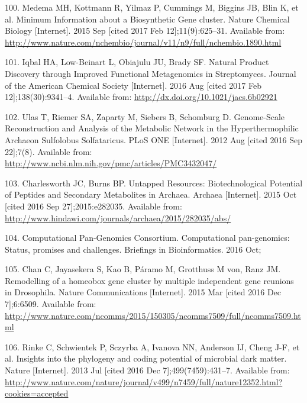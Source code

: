 \documentclass[12pt,twoside]{reedthesis}
\begin{document}
  \hypertarget{ref-medema_minimum_2015}{}
  100. Medema MH, Kottmann R, Yilmaz P, Cummings M, Biggins JB, Blin K, et
  al. Minimum Information about a Biosynthetic Gene cluster. Nature
  Chemical Biology {[}Internet{]}. 2015 Sep {[}cited 2017 Feb
  12{]};11(9):625--31. Available from:
  \url{http://www.nature.com/nchembio/journal/v11/n9/full/nchembio.1890.html}
  
  \hypertarget{ref-iqbal_natural_2016}{}
  101. Iqbal HA, Low-Beinart L, Obiajulu JU, Brady SF. Natural Product
  Discovery through Improved Functional Metagenomics in Streptomyces.
  Journal of the American Chemical Society {[}Internet{]}. 2016 Aug
  {[}cited 2017 Feb 12{]};138(30):9341--4. Available from:
  \url{http://dx.doi.org/10.1021/jacs.6b02921}
  
  \hypertarget{ref-ulas_genome-scale_2012}{}
  102. Ulas T, Riemer SA, Zaparty M, Siebers B, Schomburg D. Genome-Scale
  Reconstruction and Analysis of the Metabolic Network in the
  Hyperthermophilic Archaeon Sulfolobus Solfataricus. PLoS ONE
  {[}Internet{]}. 2012 Aug {[}cited 2016 Sep 22{]};7(8). Available from:
  \url{http://www.ncbi.nlm.nih.gov/pmc/articles/PMC3432047/}
  
  \hypertarget{ref-charlesworth_untapped_2015}{}
  103. Charlesworth JC, Burns BP. Untapped Resources: Biotechnological
  Potential of Peptides and Secondary Metabolites in Archaea. Archaea
  {[}Internet{]}. 2015 Oct {[}cited 2016 Sep 27{]};2015:e282035. Available
  from: \url{http://www.hindawi.com/journals/archaea/2015/282035/abs/}
  
  \hypertarget{ref-computational_pan-genomics_consortium_computational_2016}{}
  104. Computational Pan-Genomics Consortium. Computational pan-genomics:
  Status, promises and challenges. Briefings in Bioinformatics. 2016 Oct;
  
  \hypertarget{ref-chan_remodelling_2015}{}
  105. Chan C, Jayasekera S, Kao B, Páramo M, Grotthuss M von, Ranz JM.
  Remodelling of a homeobox gene cluster by multiple independent gene
  reunions in Drosophila. Nature Communications {[}Internet{]}. 2015 Mar
  {[}cited 2016 Dec 7{]};6:6509. Available from:
  \url{http://www.nature.com/ncomms/2015/150305/ncomms7509/full/ncomms7509.html}
  
  \hypertarget{ref-rinke_insights_2013}{}
  106. Rinke C, Schwientek P, Sczyrba A, Ivanova NN, Anderson IJ, Cheng
  J-F, et al. Insights into the phylogeny and coding potential of
  microbial dark matter. Nature {[}Internet{]}. 2013 Jul {[}cited 2016 Dec
  7{]};499(7459):431--7. Available from:
  \url{http://www.nature.com/nature/journal/v499/n7459/full/nature12352.html?cookies=accepted}
  
\end{document}
